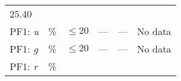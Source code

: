 \documentclass[DM,lsstdraft,toc]{lsstdoc}
\begin{document}
\begin{longtable}[]{@{}llllll@{}}
\begin{minipage}[t]{0.12\columnwidth}
25.40\strut
\end{minipage} & \begin{minipage}[t]{0.17\columnwidth}\raggedright\strut
\strut
\end{minipage}\tabularnewline
\begin{minipage}[t]{0.14\columnwidth}\raggedright\strut
PF1: \emph{u}\strut
\end{minipage} & \begin{minipage}[t]{0.06\columnwidth}\raggedright\strut
\%\strut
\end{minipage} & \begin{minipage}[t]{0.17\columnwidth}\raggedright\strut
\(\leq 20\)\strut
\end{minipage} & \begin{minipage}[t]{0.17\columnwidth}\raggedright\strut
---\strut
\end{minipage} & \begin{minipage}[t]{0.12\columnwidth}\raggedright\strut
---\strut
\end{minipage} & \begin{minipage}[t]{0.17\columnwidth}\raggedright\strut
No data\strut
\end{minipage}\tabularnewline
\begin{minipage}[t]{0.14\columnwidth}\raggedright\strut
PF1: \emph{g}\strut
\end{minipage} & \begin{minipage}[t]{0.06\columnwidth}\raggedright\strut
\%\strut
\end{minipage} & \begin{minipage}[t]{0.17\columnwidth}\raggedright\strut
\(\leq 20\)\strut
\end{minipage} & \begin{minipage}[t]{0.17\columnwidth}\raggedright\strut
---\strut
\end{minipage} & \begin{minipage}[t]{0.12\columnwidth}\raggedright\strut
---\strut
\end{minipage} & \begin{minipage}[t]{0.17\columnwidth}\raggedright\strut
No data\strut
\end{minipage}\tabularnewline
\begin{minipage}[t]{0.14\columnwidth}\raggedright\strut
PF1: \emph{r}\strut
\end{minipage} & \begin{minipage}[t]{0.06\columnwidth}\raggedright\strut
\%\strut
\end{minipage} & \begin{minipage}[t]{0.17\columnwidth}\raggedright\strut

\end{minipage}
\end{longtable}
\end{document}
